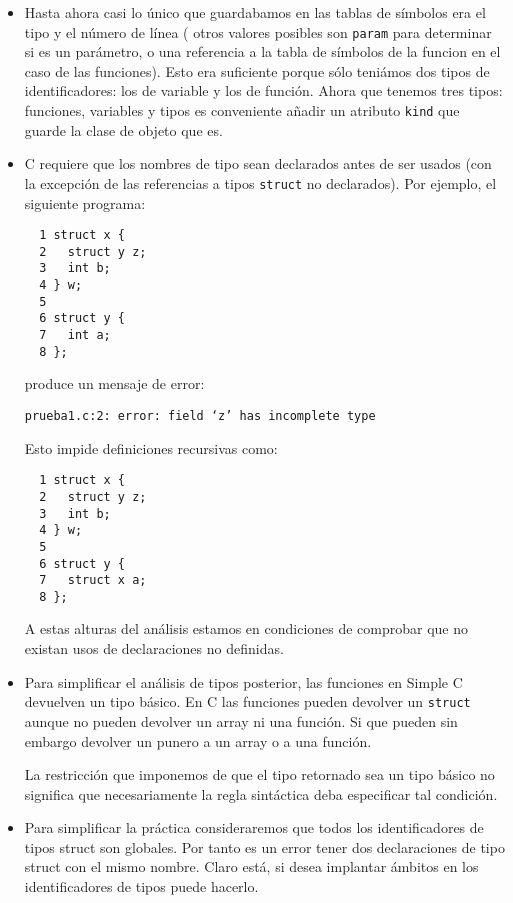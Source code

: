\begin{itemize}
\item
Hasta ahora casi lo único que guardabamos en las tablas de símbolos era el tipo y el número 
de línea ( otros valores posibles son \verb|param| para determinar si es un parámetro,
o una referencia a la tabla de símbolos de la funcion en el caso de las funciones). Esto era suficiente
porque sólo teniámos dos tipos de identificadores: los de variable y los de función. Ahora que tenemos
tres tipos: funciones, variables y tipos es conveniente añadir un atributo \verb|kind| que guarde 
la clase de objeto que es.

\item
C requiere que los nombres de tipo sean declarados antes de ser usados (con la
excepción de las referencias a tipos \verb|struct| no declarados). Por ejemplo,
el siguiente programa:

\begin{verbatim}
  1 struct x {
  2   struct y z;
  3   int b;
  4 } w;
  5
  6 struct y {
  7   int a;
  8 };
\end{verbatim}

produce un mensaje de error:

\begin{verbatim}
prueba1.c:2: error: field ‘z’ has incomplete type
\end{verbatim}
Esto impide definiciones recursivas como:

\begin{verbatim}
  1 struct x {
  2   struct y z;
  3   int b;
  4 } w;
  5
  6 struct y {
  7   struct x a;
  8 };
\end{verbatim}

A estas alturas del análisis estamos en condiciones de 
comprobar que no existan usos de declaraciones
no definidas. 
\item
Para simplificar el análisis de tipos posterior, 
las funciones en Simple C devuelven un tipo básico. 
En C las funciones pueden devolver un \verb|struct| aunque no pueden
devolver un array ni una función. Si que pueden sin embargo devolver
un punero a un array o a una función.
 
La restricción que imponemos de que el tipo retornado sea un tipo 
básico  no significa 
que necesariamente la regla sintáctica deba especificar tal condición.

\item
Para simplificar la práctica consideraremos que todos los identificadores de
tipos struct son globales. Por tanto es un error tener dos declaraciones
de tipo struct con el mismo nombre.
Claro está, si desea implantar ámbitos en los identificadores de tipos
puede hacerlo.


\end{itemize}
